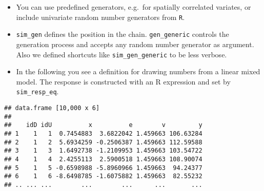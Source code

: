 \begin{itemize}
\itemsep1pt\parskip0pt
\item
  You can use predefined generators, e.g.~for spatially correlated
  variates, or include univariate random number generators from
  \texttt{R}.
\item
  \texttt{sim\_gen} defines the position in the chain.
  \texttt{gen\_generic} controls the generation process and accepts any
  random number generator as argument. Also we defined shortcuts like
  \texttt{sim\_gen\_generic} to be less verbose.
\item
  In the following you see a definition for drawing numbers from a
  linear mixed model. The response is constructed with an R expression
  and set by \texttt{sim\_resp\_eq}.
\end{itemize}

\begin{Shaded}
\end{Shaded}

\begin{verbatim}
## data.frame [10,000 x 6]
## 
##    idD idU          x          e        v         y
## 1    1   1  0.7454883  3.6822042 1.459663 106.63284
## 2    1   2  5.6934259 -0.2506387 1.459663 112.59588
## 3    1   3  1.6492738 -1.2109953 1.459663 103.54722
## 4    1   4  2.4255113  2.5900518 1.459663 108.90074
## 5    1   5 -0.6598988 -5.8960966 1.459663  94.24377
## 6    1   6 -8.6498785 -1.6075882 1.459663  82.55232
## .. ... ...        ...        ...      ...       ...
\end{verbatim}
